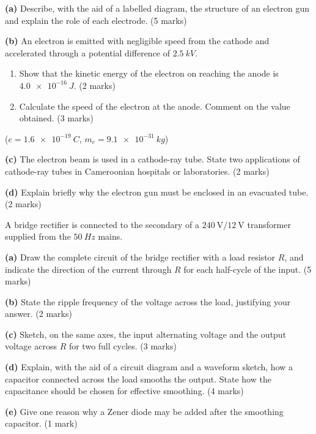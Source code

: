 \documentclass[11pt]{article}
\begin{document}
\begin{exercice}
\textbf{(a)} Describe, with the aid of a labelled diagram, the structure of an electron gun and explain the role of each electrode. \hfill (5 marks)

\textbf{(b)} An electron is emitted with negligible speed from the cathode and accelerated through a potential difference of $\SI{2.5}{kV}$.
\begin{enumerate}
\item Show that the kinetic energy of the electron on reaching the anode is $\SI{4.0e-16}{J}$. \hfill (2 marks)
\item Calculate the speed of the electron at the anode. Comment on the value obtained. \hfill (3 marks)
\end{enumerate}
($e = \SI{1.6e-19}{C}$, $m_e = \SI{9.1e-31}{kg}$)

\textbf{(c)} The electron beam is used in a cathode-ray tube. State two applications of cathode-ray tubes in Cameroonian hospitals or laboratories. \hfill (2 marks)

\textbf{(d)} Explain briefly why the electron gun must be enclosed in an evacuated tube. \hfill (2 marks)
\end{exercice}

\begin{exercice}
A bridge rectifier is connected to the secondary of a $240\ \mathrm{V}/12\ \mathrm{V}$ transformer supplied from the $\SI{50}{Hz}$ mains.

\textbf{(a)} Draw the complete circuit of the bridge rectifier with a load resistor $R$, and indicate the direction of the current through $R$ for each half-cycle of the input. \hfill (5 marks)

\textbf{(b)} State the ripple frequency of the voltage across the load, justifying your answer. \hfill (2 marks)

\textbf{(c)} Sketch, on the same axes, the input alternating voltage and the output voltage across $R$ for two full cycles. \hfill (3 marks)

\textbf{(d)} Explain, with the aid of a circuit diagram and a waveform sketch, how a capacitor connected across the load smooths the output. State how the capacitance should be chosen for effective smoothing. \hfill (4 marks)

\textbf{(e)} Give one reason why a Zener diode may be added after the smoothing capacitor. \hfill (1 mark)
\end{exercice}
\end{document}
